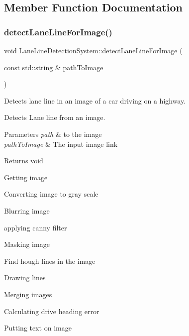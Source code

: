 \subsection{Member Function Documentation}
\mbox{\label{class_lane_line_detection_system_ac8e63a39cd08f46aeb4717c2e5ab2798}} 
\subsubsection{\texorpdfstring{detect\+Lane\+Line\+For\+Image()}{detectLaneLineForImage()}}
{\footnotesize\ttfamily void Lane\+Line\+Detection\+System\+::detect\+Lane\+Line\+For\+Image (\begin{DoxyParamCaption}\item[{const std\+::string \&}]{path\+To\+Image }\end{DoxyParamCaption})}



Detects lane line in an image of a car driving on a highway. 

Detects Lane line from an image.


\begin{DoxyParams}{Parameters}
{\em path} & to the image\\
\hline
{\em path\+To\+Image} & The input image link\\
\hline
\end{DoxyParams}
\begin{DoxyReturn}{Returns}
void 
\end{DoxyReturn}
Getting image

Converting image to gray scale

Blurring image

applying canny filter

Masking image

Find hough lines in the image

Drawing lines

Merging images

Calculating drive heading error

Putting text on image \mbox{\label{class_lane_line_detection_system_a32fd8f62c205e81770ab11c77c5e48f4}} 
